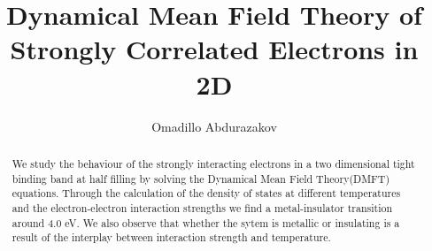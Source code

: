 \documentclass[aps,prl,twocolumn,showpacs,floatfix,superscriptaddress]{revtex4-1}
\begin{document}

\title{Dynamical Mean Field Theory of Strongly Correlated Electrons in 2D}%

\author{Omadillo Abdurazakov}
%





\begin{abstract}
We study the behaviour of the strongly interacting electrons in a two dimensional tight binding band at half filling by solving the Dynamical Mean Field Theory(DMFT) equations. Through the calculation of the density of states at different temperatures and the electron-electron interaction strengths we find a metal-insulator transition around 4.0 eV. We also observe that whether the sytem is metallic or insulating is a result of the interplay between interaction strength and temperature. 
\end{abstract}

\maketitle
\end{document}
